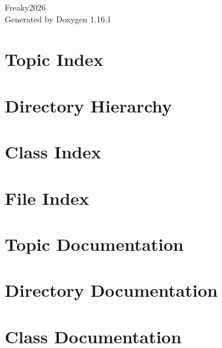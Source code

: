 \documentclass[twoside]{book}
\newcommand{\+}{\discretionary{\mbox{\scriptsize$\hookleftarrow$}}{}{}}
\newcommand{\clearemptydoublepage}{%
    \newpage{\pagestyle{empty}\cleardoublepage}%
  }
\begin{document}
  \raggedbottom
    \hypersetup{pageanchor=false,
                bookmarksnumbered=true,
                pdfencoding=unicode
               }
  \begin{titlepage}
  \vspace*{7cm}
  \begin{center}%
  {\Large Freaky2026}\\
  \vspace*{1cm}
  {\large Generated by Doxygen 1.16.1}\\
  \end{center}
  \end{titlepage}
  \clearemptydoublepage
  \tableofcontents
  \clearemptydoublepage
  \hypersetup{pageanchor=true}
\chapter{Topic Index}

\chapter{Directory Hierarchy}

\chapter{Class Index}

\chapter{File Index}

\chapter{Topic Documentation}

\chapter{Directory Documentation}


\chapter{Class Documentation}



\end{document}
